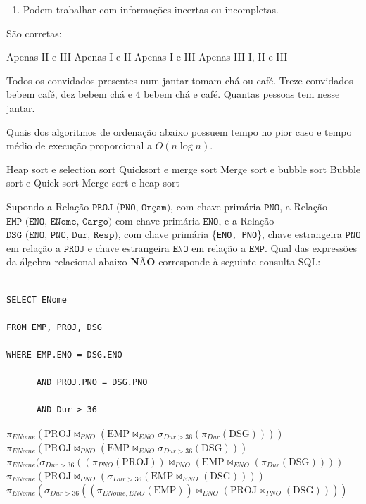 \documentclass[12pt, addpoints]{exam}
\begin{document}
\begin{questions}
\begin{enumerate}[label=\Roman*.]
    \item Podem trabalhar com informações incertas ou incompletas. 

\end{enumerate}

São corretas:
\begin{choices}
\choice Apenas II e III
\choice Apenas I e II
\choice Apenas I e III
\choice Apenas III
\choice I, II e III
\end{choices}

\question

Todos os convidados presentes num jantar tomam chá ou café. Treze convidados bebem café, dez bebem chá e 4 bebem chá e café. Quantas pessoas tem nesse jantar.


\begin{choices}
\end{choices}

\question

Quais dos algoritmos de ordenação abaixo possuem tempo no pior caso e tempo médio de execução proporcional a \( O(n \log n) \).
\begin{choices}
\choice Heap sort e selection sort
\choice Quicksort e merge sort
\choice Merge sort e bubble sort
\choice Bubble sort e Quick sort
\choice Merge sort e heap sort
\end{choices}

\question

Supondo a Relação $\texttt{PROJ (PNO, Orçam)}$, com chave primária $\texttt{PNO}$, a Relação $\texttt{EMP (ENO, ENome, Cargo)}$ com chave primária $\texttt{ENO}$, e a Relação $\texttt{DSG (ENO, PNO, Dur, Resp)}$, com chave primária \{\texttt{ENO, PNO}\}, chave estrangeira $\texttt{PNO}$ em relação a $\texttt{PROJ}$ e chave estrangeira $\texttt{ENO}$ em relação a $\texttt{EMP}$. Qual das expressões da álgebra relacional abaixo $\textbf{NÃO}$ corresponde à seguinte consulta SQL:



\begin{verbatim}

SELECT ENome

FROM EMP, PROJ, DSG

WHERE EMP.ENO = DSG.ENO

      AND PROJ.PNO = DSG.PNO

      AND Dur > 36

\end{verbatim}
\begin{choices}
\choice \( \pi_{ENome} (\text{PROJ} \Join_{PNO} (\text{EMP} \Join_{ENO} \sigma_{Dur > 36} (\pi_{Dur} (\text{DSG})))) \)
\choice \( \pi_{ENome} (\text{PROJ} \Join_{PNO} (\text{EMP} \Join_{ENO} \sigma_{Dur > 36} (\text{DSG}))) \)
\choice \( \pi_{ENome} (\sigma_{Dur > 36} ((\pi_{PNO} (\text{PROJ})) \Join_{PNO} (\text{EMP} \Join_{ENO} (\pi_{Dur} (\text{DSG})))) \)
\choice \( \pi_{ENome} (\text{PROJ} \Join_{PNO} (\sigma_{Dur > 36} (\text{EMP} \Join_{ENO} (\text{DSG})))) \)
\choice \( \pi_{ENome} (\sigma_{Dur > 36} ((\pi_{ENome, ENO} (\text{EMP})) \Join_{ENO} (\text{PROJ} \Join_{PNO} (\text{DSG})))) \)
\end{choices}


\end{questions}
\end{document}
